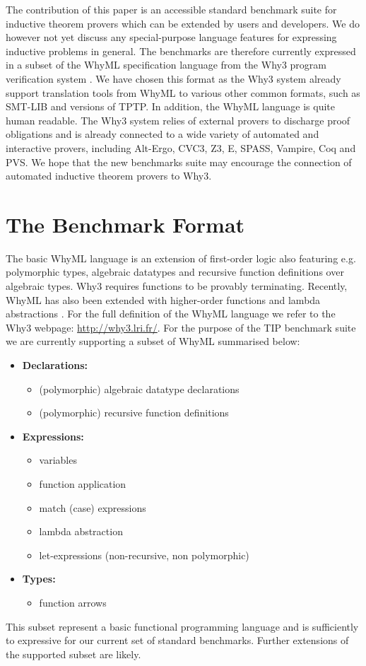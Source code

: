 \documentclass{llncs}
\begin{document}
The contribution of this paper is an accessible standard benchmark suite for inductive theorem provers which can be extended by users and developers. We do however not yet discuss any special-purpose language features for expressing inductive problems in general. The benchmarks are therefore currently expressed in a subset of the WhyML specification language from the Why3 program verification system \cite{boogie11why3,Why3}. We have chosen this format as the Why3 system already support translation tools from WhyML to various other common formats, such as SMT-LIB and versions of TPTP. 
In addition, the WhyML language is quite human readable. The Why3 system relies of external provers to discharge proof obligations and is already connected to a wide variety of automated and interactive provers, including  Alt-Ergo, CVC3, Z3, E, SPASS, Vampire, Coq and PVS. We hope that the new benchmarks suite may encourage the connection of automated inductive theorem provers to Why3. 

\section{The Benchmark Format}
\label{sec:format}
The basic WhyML language is an extension of first-order logic also featuring e.g. polymorphic types, algebraic datatypes and recursive function definitions over algebraic types. Why3 requires functions to be provably terminating. Recently, WhyML has also been extended with higher-order functions and lambda abstractions \cite{HOWhyML}. For the full definition of the WhyML language we refer to the Why3 webpage: \url{http://why3.lri.fr/}. For the purpose of the TIP benchmark suite we are currently supporting a subset of WhyML summarised below:
\begin{itemize}
\item \textbf{Declarations:} 
	\begin{itemize}
	\item (polymorphic) algebraic datatype declarations
	\item (polymorphic) recursive function definitions
	\end{itemize}
\item \textbf{Expressions:} 
	\begin{itemize}
	\item variables
	\item function application
	\item match (case) expressions
	\item lambda abstraction
	\item let-expressions (non-recursive, non polymorphic)
	\end{itemize}
\item \textbf{Types:}
	\begin{itemize}
	\item function arrows
	\end{itemize}
\end{itemize}	
This subset represent a basic functional programming language and is sufficiently to expressive for our current set of standard benchmarks. Further extensions of the supported subset are likely. 
\end{document}
